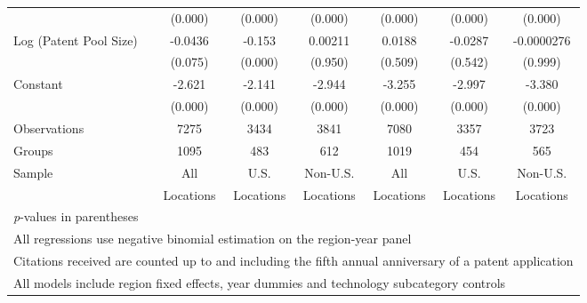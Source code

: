 \documentclass[12pt,letterpaper]{article}
\begin{document}
\begin{table}[htbp]
\begin{tabular}{l*{6}{c}}
                &  (0.000)&  (0.000)&  (0.000)&  (0.000)&  (0.000)&  (0.000)\\
Log (Patent Pool Size)&  -0.0436&   -0.153&  0.00211&   0.0188&  -0.0287&-0.0000276\\
                &  (0.075)&  (0.000)&  (0.950)&  (0.509)&  (0.542)&  (0.999)\\
Constant        &   -2.621&   -2.141&   -2.944&   -3.255&   -2.997&   -3.380\\
                &  (0.000)&  (0.000)&  (0.000)&  (0.000)&  (0.000)&  (0.000)\\
\hline
Observations    &     7275&     3434&     3841&     7080&     3357&     3723\\
Groups          &     1095&      483&      612&     1019&      454&      565\\
Sample&All &U.S. &Non-U.S.&All &U.S. &Non-U.S. \\
          &Locations &Locations&Locations&Locations &Locations&Locations \\
\hline\hline
\multicolumn{7}{l}{\footnotesize \textit{p}-values in parentheses}\\
\multicolumn{7}{l}{\footnotesize All regressions use negative binomial estimation on the region-year panel}\\
\multicolumn{7}{l}{\footnotesize Citations received are counted up to and including the fifth annual anniversary of a patent application}\\
\multicolumn{7}{l}{\footnotesize All models include region fixed effects, year dummies and technology subcategory controls}\\
\end{tabular}
\end{table}
\end{document}
